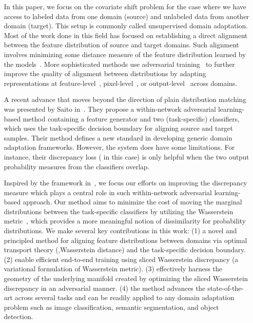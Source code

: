 \documentclass[10pt,twocolumn,letterpaper]{article}
\begin{document}
In this paper, we focus on the covariate shift problem for the case where we have access to labeled data from one domain (source) and unlabeled data from another domain (target). This setup is commonly called unsupervised domain adaptation.
 Most of the work done in this field has focused on establishing a direct alignment between the feature distribution of source and target domains.
 Such alignment involves minimizing some distance measure of the feature distribution learned by the models~\cite{saenko2010adapting, ganin2014unsupervised, long2015learning}.
 More sophisticated methods use adversarial training~\cite{goodfellow2014generative} to further improve the quality of alignment between distributions by adapting representations at feature-level~\cite{hoffman2016fcns, ganin2016domain}, pixel-level~\cite{liu2016coupled, tzeng2017adversarial, bousmalis2017unsupervised}, or output-level~\cite{tsai2018learning} across domains.
 
A recent advance that moves beyond the direction of plain distribution matching was presented by Saito \etal in~\cite{saito2017maximum}.
They propose a within-network adversarial learning-based method containing a feature generator and two (task-specific) classifiers, which uses the task-specific decision boundary for aligning source and target samples.
Their method defines a new standard in developing generic domain adaptation frameworks. However, the system does have some limitations. For instance, their discrepancy loss ( in this case) is only helpful when the two output probability measures from the classifiers overlap.


Inspired by the framework in~\cite{saito2017maximum}, we focus our efforts on improving the discrepancy measure which plays a central role in such within-network adversarial learning-based approach.
Our method aims to minimize the cost of moving the marginal distributions between the task-specific classifiers by utilizing the Wasserstein metric~\cite{monge1781memoire, kantorovitch1958translocation, arjovsky2017wasserstein}, which provides a more meaningful notion of dissimilarity for probability distributions.
We make several key contributions in this work:
(1) a novel and principled method for aligning feature distributions between domains via optimal transport theory (\ie,Wasserstein distance) and the task-specific decision boundary.
(2) enable efficient end-to-end training using sliced Wasserstein discrepancy (a variational formulation of Wasserstein metric).
(3) effectively harness the geometry of the underlying manifold created by optimizing the sliced Wasserstein discrepancy in an adversarial manner.
(4) the method advances the state-of-the-art across several tasks and can be readily applied to any domain adaptation problem such as image classification, semantic segmentation, and object detection.
\end{document}
